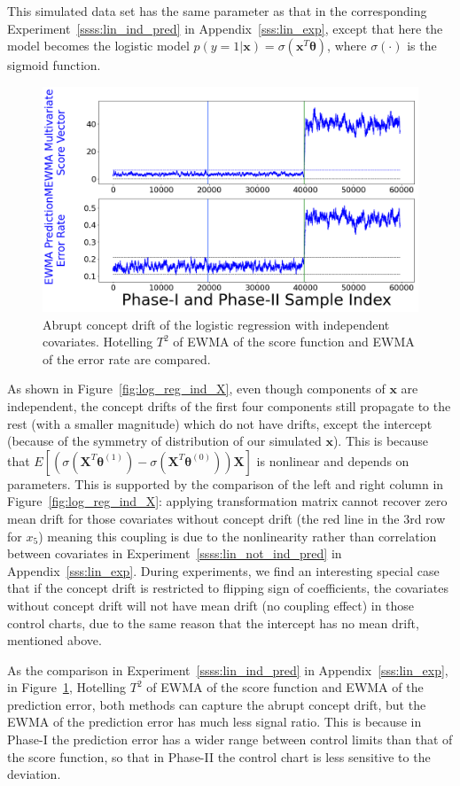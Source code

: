 \documentclass[twoside,11pt]{article}
\begin{document}
\begin{appendix}
This simulated data set has the same parameter as that in the corresponding Experiment~\ref{ssss:lin_ind_pred} in Appendix~\ref{sss:lin_exp}, except that here the model becomes the {logistic model} {$p(y=1|\bm {x})= \sigma (\bm {x}^T\bm { \theta})$,} where $\sigma (\cdot)$ is the sigmoid function.
\begin{figure}[!htbp]
\centering
\includegraphics[width = 0.6\linewidth]{../figures/v14/sim_5/logi_no_muco/1_sim5_logi_1e-08_0_005_1.png}
  \caption{Abrupt concept drift of the logistic regression with independent covariates. Hotelling $T^2$ of EWMA of the score function and EWMA of the error rate are compared.}
  \label{fig:log_reg_ind_X_comp}
\end{figure}

As shown in Figure~\ref{fig:log_reg_ind_X}, even though components of $\bm {x}$ are independent, the concept drifts of the first four components still propagate to the rest (with a smaller magnitude) which do not have drifts, except the intercept (because of the symmetry of distribution of our simulated $\bm {x}$). This is because that $E [ (\sigma ( \bm {X}^T\bm { \theta}^{(1)} ) - \sigma ( \bm {X}^T\bm { \theta}^{(0)} )) \bm {X}] $ is nonlinear and depends on parameters. This is supported by the comparison of the left and right column in Figure~\ref{fig:log_reg_ind_X}: applying transformation matrix cannot recover zero mean drift for those covariates without concept drift (the red line in the $3$rd row for $x_5$) meaning this coupling is due to the nonlinearity rather than correlation between covariates in Experiment~\ref{ssss:lin_not_ind_pred} in Appendix~\ref{sss:lin_exp}. During experiments, we find an interesting special case that if the concept drift is restricted to flipping sign of coefficients, the covariates without concept drift will not have mean {drift} (no coupling effect) in those control charts, due to the same reason that the intercept has no mean drift, mentioned above.

As the comparison in Experiment~\ref{ssss:lin_ind_pred} in Appendix~\ref{sss:lin_exp}, in Figure~\ref{fig:log_reg_ind_X_comp}, Hotelling $T^2$ of EWMA of the score function and EWMA of the prediction error, both methods can capture the abrupt concept drift, but the EWMA of the prediction error has much less signal ratio. This is because in Phase-I the prediction error has a wider range between control limits than that of the score function, so that in Phase-II the control chart is less sensitive to the deviation.


\end{appendix}
\end{document}
